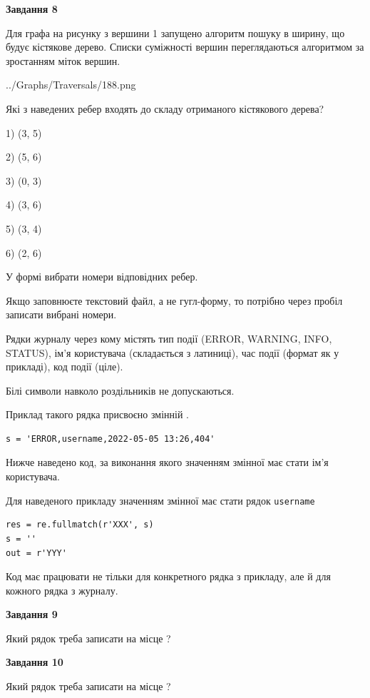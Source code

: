\documentclass[12pt, ukrainian]{article}
\def\code#1{\Verb!#1!}
\begin{document}
{\begin {large}
{\begin {center}\textbf{Завдання 8}\end {center}}\par
Для графа на рисунку з вершини 1 запущено алгоритм пошуку в ширину, що будує кістякове дерево. Списки суміжності вершин переглядаються алгоритмом за зростанням міток вершин.\par
\begin{center}
	{../Graphs/Traversals/188.png}
\end{center}
\par Які з наведених ребер входять до складу отриманого кістякового дерева?\par
1) (3, 5)\par
2) (5, 6)\par
3) (0, 3)\par
4) (3, 6)\par
5) (3, 4)\par
6) (2, 6)\par
{\vskip 15pt} У формі вибрати номери відповідних ребер.


Якщо заповнюєте текстовий файл, а не гугл-форму, то потрібно через пробіл записа\-ти вибрані номери.\par
\newpage


Рядки журналу через кому містять тип події (ERROR, WARNING, INFO, STATUS), ім'я користувача (складається з латиниці), час події (фор\-мат як у прикладі), код події (ціле).

Білі символи навколо роздільників не допускаються.

Приклад такого рядка присвоєно змінній .



\begin{verbatim}
s = 'ERROR,username,2022-05-05 13:26,404'
\end{verbatim}


Нижче наведено код, за виконання якого значенням змінної  має стати ім'я користувача.

Для наведеного прикладу значенням змінної  має стати рядок \code{username}



\begin{verbatim}
res = re.fullmatch(r'XXX', s)
s = ''
out = r'YYY'
\end{verbatim}


Код має працювати не тільки для конкретного рядка з прикладу, але й для кожного рядка з журналу.

{\begin {center}\textbf{Завдання 9}\end {center}}\par
Який рядок треба записати на місце  ?\par
\vspace{5mm}


{\begin {center}\textbf{Завдання 10}\end {center}}\par
Який рядок треба записати на місце  ?\par


\newpage


\end {large}}
\end{document}
